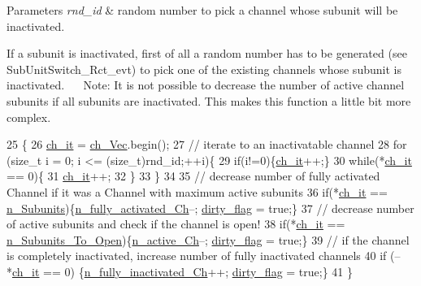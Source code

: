 \begin{DoxyParams}{Parameters}
{\em rnd\+\_\+id} & random number to pick a channel whose subunit will be inactivated.\\
\hline
\end{DoxyParams}
If a subunit is inactivated, first of all a random number has to be generated (see Sub\+Unit\+Switch\+\_\+\+Rct\+\_\+evt) to pick one of the existing channels whose subunit is inactivated.~\newline
~\newline
Note\+: It is not possible to decrease the number of active channel subunits if all subunits are inactivated. This makes this function a little bit more complex. 
\begin{DoxyCode}
25                                                \{
26     \hyperlink{classnw_1_1_channel___spc_a025013604067ea03dce585fb5a785408}{ch\_it} = \hyperlink{classnw_1_1_channel___spc_aca3ddf4eba759eeeb835bba168795a11}{ch\_Vec}.begin();
27 \textcolor{comment}{//  iterate to an inactivatable channel}
28     \textcolor{keywordflow}{for} (\textcolor{keywordtype}{size\_t} i = 0; i <= (size\_t)rnd\_id;++i)\{
29         \textcolor{keywordflow}{if}(i!=0)\{\hyperlink{classnw_1_1_channel___spc_a025013604067ea03dce585fb5a785408}{ch\_it}++;\}
30         \textcolor{keywordflow}{while}(*\hyperlink{classnw_1_1_channel___spc_a025013604067ea03dce585fb5a785408}{ch\_it} == 0)\{
31             \hyperlink{classnw_1_1_channel___spc_a025013604067ea03dce585fb5a785408}{ch\_it}++;
32         \}
33     \}
34 
35 \textcolor{comment}{//  decrease number of fully activated Channel if it was a Channel with maximum active subunits}
36     \textcolor{keywordflow}{if}(*\hyperlink{classnw_1_1_channel___spc_a025013604067ea03dce585fb5a785408}{ch\_it} == \hyperlink{classnw_1_1_channel___spc_a2b63ef7e5147046919cf96060b57e078}{n\_Subunits})\{\hyperlink{classnw_1_1_channel___spc_ac6ae04b799c751bb61918b4ab163ce85}{n\_fully\_activated\_Ch}--; 
      \hyperlink{classnw_1_1___species_a79157bae3920ce7bba35e3f75b2aad6f}{dirty\_flag} = \textcolor{keyword}{true};\}
37 \textcolor{comment}{//  decrease number of active subunits and check if the channel is open!}
38     \textcolor{keywordflow}{if}(*\hyperlink{classnw_1_1_channel___spc_a025013604067ea03dce585fb5a785408}{ch\_it} == \hyperlink{classnw_1_1_channel___spc_a52e6e8aae67ebfb6cec1b79e7f125542}{n\_Subunits\_To\_Open})\{\hyperlink{classnw_1_1_channel___spc_a67fd1b83563c30ec86802bdab420c95d}{n\_active\_Ch}--; 
      \hyperlink{classnw_1_1___species_a79157bae3920ce7bba35e3f75b2aad6f}{dirty\_flag} = \textcolor{keyword}{true};\}
39 \textcolor{comment}{//  if the channel is completely inactivated, increase number of fully inactivated channels}
40     \textcolor{keywordflow}{if} (--*\hyperlink{classnw_1_1_channel___spc_a025013604067ea03dce585fb5a785408}{ch\_it} == 0) \{\hyperlink{classnw_1_1_channel___spc_a35afc71aa0eeb5b1e4a2089a5c1f65ae}{n\_fully\_inactivated\_Ch}++; 
      \hyperlink{classnw_1_1___species_a79157bae3920ce7bba35e3f75b2aad6f}{dirty\_flag} = \textcolor{keyword}{true};\}
41 \}
\end{DoxyCode}
